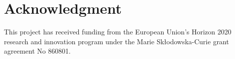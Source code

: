 \documentclass[sw]{iosart2x}
\begin{document}

\section{Acknowledgment}\label{s7}
This project has received funding from the European Union’s Horizon 2020 research and innovation program under the Marie Skłodowska-Curie grant agreement No 860801.





\end{document}
